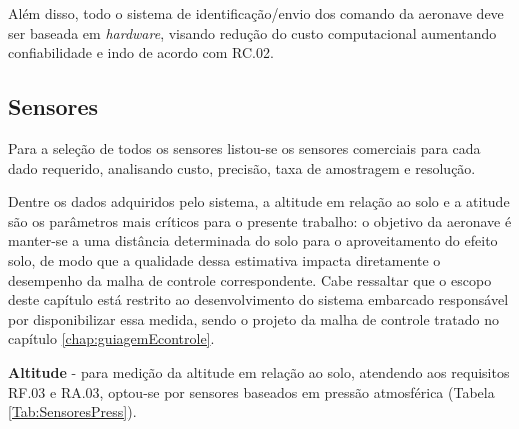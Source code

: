 Além disso, todo o sistema de identificação/envio dos comando da aeronave deve ser baseada em \textit{hardware}, visando redução do custo computacional aumentando confiabilidade e indo de acordo com RC.02.

\subsection{Sensores}
\label{subsec:sensores}
 Para a seleção de todos os sensores listou-se os sensores comerciais para cada dado requerido, analisando custo, precisão, taxa de amostragem e resolução.

Dentre os dados adquiridos pelo sistema, a altitude em relação ao solo e a atitude são os parâmetros mais críticos para o presente trabalho: o objetivo da aeronave é manter-se a uma distância determinada do solo para o aproveitamento do efeito solo, de modo que a qualidade dessa estimativa impacta diretamente o desempenho da malha de controle correspondente. Cabe ressaltar que o escopo deste capítulo está restrito ao desenvolvimento do sistema embarcado responsável por disponibilizar essa medida, sendo o projeto da malha de controle tratado no capítulo \ref{chap:guiagemEcontrole}.

 \textbf{Altitude} - para medição da altitude em relação ao solo, atendendo aos requisitos RF.03 e RA.03, optou-se por sensores baseados em pressão atmosférica (Tabela \ref{Tab:SensoresPress}).

